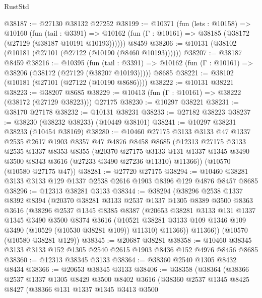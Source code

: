 \begin{lexlean}{RustStd}
\begin{coremodule}
@38187 := @27130 @38132 @27252
@38199 := @10371
    (fun (lets : @10158) =>
    @10160
      (fun (tail : @3391) =>
      @10162 (fun (Γ : @10161) => @38185 (@38172 (@27129 (@38187 @10191 @10193))))))
    @8459
@38206 := @10131 (@38102 (@10181 (@27101 (@27122 (@10190 (@8460 @10193))))))
@38207 := @38187 @8459
@38216 := @10395
    (fun (tail : @3391) => @10162 (fun (Γ : @10161) => @38206 (@38172 (@27129 (@38207 @10193)))))
    @8685
@38221 := @38102 (@10181 (@27101 (@27122 (@10190 @8686))))
@38222 := @10131 @38221
@38223 := @38207 @8685
@38229 := @10413 (fun (Γ : @10161) => @38222 (@38172 (@27129 @38223))) @27175
@38230 := @10297 @38221
@38231 := @38170 @27178
@38232 := @10131 @38231
@38233 := @27182 @38223
@38237 := @38230 (@38232 @38233) (@10449 @38101)
@38241 := @10297 @38231 @38233 (@10454 @38169)
@38280 := @10460
    @27175
    @3133
    @3133
    @47
    @1337
    @2535
    @2617
    @1903
    @8357
    @47
    @4876
    @8458
    @8685
    (@12313
      @27175
      @3133
      @2535
      @1337
      @8353
      @8355
      (@20370
        @27175
        @3133
        @131
        @1337
        @1345
        @3490
        @3500
        @8343
        @3616
        (@27233 @3490 @27236 @11310)
        @11366))
    (@10570 (@10580 @27175 @47))
@38281 := @27720 @27175
@38294 := @10460 @38281 @3133 @3133 @129 @1337 @2538 @2616 @1903 @8396 @129 @4876 @8457 @8685
@38296 := @12313 @38281 @3133
@38344 := @38294
    (@38296
      @2538
      @1337
      @8392
      @8394
      (@20370
        @38281
        @3133
        @2537
        @1337
        @1305
        @8389
        @3500
        @8363
        @3616
        (@38296
          @2537
          @1345
          @8385
          @8387
          (@20653
            @38281
            @3133
            @131
            @1337
            @1345
            @3490
            @3500
            @8374
            @3616
            (@10521 @38281 @3133 @109 @1346 @109 @3490 (@10529 (@10530 @38281 @109)) @11310)
            @11366))
        @11366))
    (@10570 (@10580 @38281 @129))
@38345 := @20687 @38281
@38358 := @10460 @38345 @3133 @3133 @152 @1305 @2540 @2615 @1903 @8436 @152 @4976 @8456 @8685
@38360 := @12313 @38345 @3133
@38364 := @38360 @2540 @1305 @8432 @8434
@38366 := @20653 @38345 @3133
@38406 := @38358
    (@38364
      (@38366
        @2537
        @1337
        @1305
        @8429
        @3500
        @8402
        @3616
        (@38360
          @2537
          @1345
          @8425
          @8427
          (@38366
            @131
            @1337
            @1345
            @3413
            @3500

\end{coremodule}
\end{lexlean}
